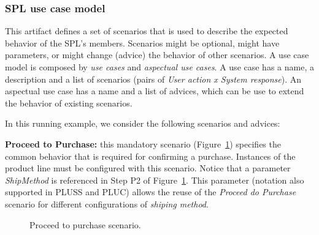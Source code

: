 \documentclass{acm_proc_article-sp}
\begin{document}
\subsubsection{SPL use case model}

This artifact defines a set of scenarios that is used to describe the expected
behavior of the SPL's members. Scenarios might be optional, might have
parameters, or might change (advice) the behavior of other scenarios. A use case model is
composed by \emph{use cases} and \emph{aspectual use cases}. A use case has a
name, a description and a list of scenarios (pairs of \emph{User action x System
response}). An aspectual use case has a name and a list of advices, which can be
use to extend the behavior of existing scenarios.

In this running example, we consider the following scenarios and advices:

{\bf Proceed to Purchase:} this mandatory scenario
(Figure~\ref{fig:proceed-to-checkout}) specifies the common behavior that is
required for confirming a purchase. Instances of the product line must be
configured with this scenario. Notice that a parameter
\emph{ShipMethod} is referenced in Step P2 of
Figure~\ref{fig:proceed-to-checkout}. This parameter (notation
also supported in PLUSS and PLUC) allows the reuse of the \emph{Proceed do
Purchase} scenario for different configurations of \emph{shiping method}.

\begin{figure}[h]
\caption{Proceed to purchase scenario.}
\label{fig:proceed-to-checkout}
\end{figure}
\end{document}
